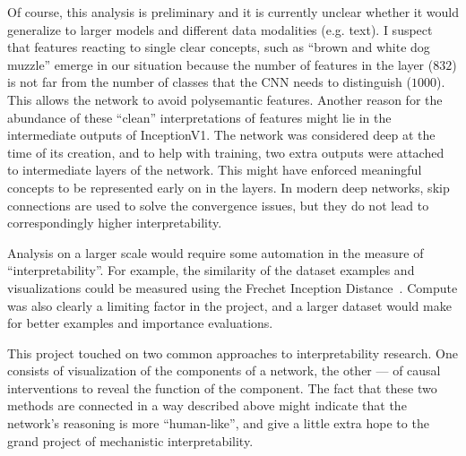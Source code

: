 \documentclass[12pt]{article}
\begin{document}
Of course, this analysis is preliminary and it is currently unclear whether it would generalize to larger models and different data modalities (e.g. text). I suspect that features reacting to single clear concepts, such as ``brown and white dog muzzle'' emerge in our situation because the number of features in the layer ($832$) is not far from the number of classes that the CNN needs to distinguish ($1000$). This allows the network to avoid polysemantic features. Another reason for the abundance of these ``clean'' interpretations of features might lie in the intermediate outputs of InceptionV1. The network was considered deep at the time of its creation, and to help with training, two extra outputs were attached to intermediate layers of the network. This might have enforced meaningful concepts to be represented early on in the layers. In modern deep networks, skip connections are used to solve the convergence issues, but they do not lead to correspondingly higher interpretability.

Analysis on a larger scale would require some automation in the measure of ``interpretability''. For example, the similarity of the dataset examples and visualizations could be measured using the Frechet Inception Distance~\cite{heusel2017gans}. Compute was also clearly a limiting factor in the project, and a larger dataset would make for better examples and importance evaluations.

This project touched on two common approaches to interpretability research. One consists of visualization of the components of a network, the other --- of causal interventions to reveal the function of the component. The fact that these two methods are connected in a way described above might indicate that the network's reasoning is more ``human-like'', and give a little extra hope to the grand project of mechanistic interpretability.

\begingroup
\raggedright
\sloppy


\endgroup


\clearpage
\end{document}
